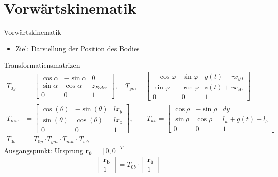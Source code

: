 \documentclass[10pt,xcolor=dvipsnames]{beamer}
\begin{document}
\section{Vorwärtskinematik}
	\begin{frame}{Vorwärtskinematik}
		\begin{itemize}
			\item Ziel: Darstellung der Position des Bodies
		\end{itemize}
		Transformationsmatrizen
		\begin{align*}
			T_{0y} &= \begin{bmatrix}\cos\alpha & -\sin\alpha & 0\\\sin\alpha & \cos\alpha & z_{Feder}\\0&0&1 \end{bmatrix}, \quad
			T_{ym} = \begin{bmatrix}-\cos\varphi & \sin\varphi & y(t)+rx_{y0}\\\sin\varphi & \cos\varphi & z(t)+rx_{z0}\\0&0&1 \end{bmatrix}\\
			T_{mw} &= \begin{bmatrix}\cos(\theta) & -\sin(\theta) & lx_{y}\\\sin(\theta) & \cos(\theta) & lx_{z}\\0&0&1 \end{bmatrix}, \qquad
			T_{wb} = \begin{bmatrix}\cos\rho & -\sin\rho & dy\\\sin\rho & \cos\rho & l_{w}+g(t)+l_{b}\\0&0&1 \end{bmatrix}\\
			T_{0b}&= T_{0y}\cdot T_{ym}\cdot T_{mw}\cdot T_{wb}
		\end{align*}
		Ausgangspunkt: Ursprung $ \bm{r_{0}} = [0, 0]^{T} $
		\begin{align*}
			\begin{bmatrix}\bm{r_{b}}\\1\end{bmatrix} = T_{0b}\cdot\begin{bmatrix}\bm{r_{0}}\\1\end{bmatrix}
		\end{align*}
	\end{frame}
\end{document}
